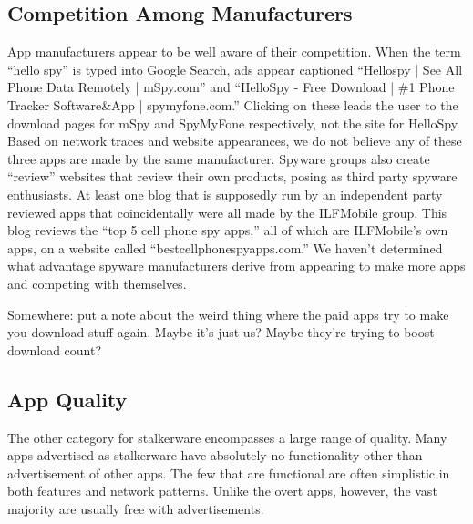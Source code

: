 \documentclass[acmtog]{acmart}
\begin{document}
\subsection{Competition Among Manufacturers}

App manufacturers appear to be well aware of their competition. When the term 
``hello spy'' is typed into Google Search, ads appear captioned ``Hellospy | 
See All Phone Data Remotely | mSpy.com'' and ``HelloSpy - Free Download | \#1 
Phone Tracker Software\&App | spymyfone.com.'' Clicking on these leads the user 
to the download pages for mSpy and SpyMyFone respectively, not the site for 
HelloSpy. Based on network traces and website appearances, we do not believe 
any of these three apps are made by the same manufacturer. Spyware groups also 
create “review” websites that review their own products, posing as third party 
spyware enthusiasts. At least one blog that is supposedly run by 
an independent party reviewed apps that coincidentally were all made by the 
ILFMobile group\cite{noauthor_best_nodate}. This blog reviews the 
“top 5 cell phone spy apps,” all of which are ILFMobile’s own apps, on a 
website called “bestcellphonespyapps.com.” We haven’t determined what advantage 
spyware manufacturers derive from appearing to make more apps and competing 
with themselves.

Somewhere: put a note about the weird thing where the paid apps try to make you 
download stuff again. Maybe it's just us? Maybe they're trying to boost 
download count?



\subsection{App Quality}

The other category for stalkerware encompasses a large range of quality. Many 
apps advertised as stalkerware have absolutely no functionality other than 
advertisement of other apps. The few that are functional are often simplistic 
in both features and network patterns. Unlike the overt apps, however, the vast 
majority are usually free with advertisements. 
\end{document}
